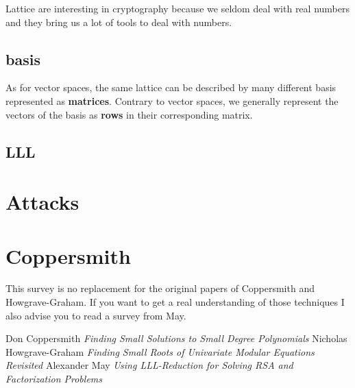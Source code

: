 \documentclass[a4paper,11pt]{article}
\begin{document}
Lattice are interesting in cryptography because we seldom deal with real numbers and they bring us a lot of tools to deal with numbers.

\subsection{basis}

As for vector spaces, the same lattice can be described by many different basis represented as \textbf{matrices}. Contrary to vector spaces, we generally represent the vectors of the basis as \textbf{rows} in their corresponding matrix.

\subsection{LLL}

\section{Attacks}\label{attacks}

\section{Coppersmith}\label{coppersmith}

This survey is no replacement for the original papers of Coppersmith\cite{coppersmith} and Howgrave-Graham\cite{howgrave-graham}. If you want to get a real understanding of those techniques I also advise you to read a survey from May\cite{may}.

\newpage
\begin{thebibliography}{1}

 Don Coppersmith {\em Finding Small Solutions to Small Degree Polynomials}
 Nicholas Howgrave-Graham {\em Finding Small Roots of Univariate Modular Equations Revisited}
 Alexander May {\em Using LLL-Reduction for Solving RSA and Factorization Problems}

\end{thebibliography}
\end{document}
